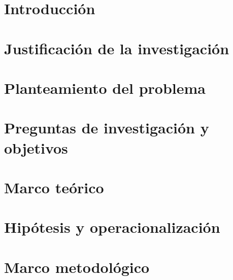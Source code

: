 \documentclass[12pt,letterpaper,oneside,openany]{book}
\begin{document}
\clearpage

\listoftables
\listoffigures
\clearpage

\chapter{Introducción}



\clearpage

\chapter{Justificación de la investigación}



\clearpage

\chapter{Planteamiento del problema}



\clearpage

\chapter{Preguntas de investigación y objetivos}



\clearpage

\chapter{Marco teórico}



\clearpage

\chapter{Hipótesis y operacionalización}



\clearpage

\chapter{Marco metodológico}


\end{document}
